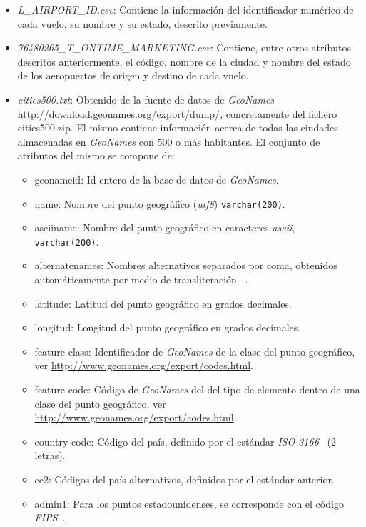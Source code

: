 \documentclass{article}
\begin{document}
\begin{itemize}
    \item \textit{L\_AIRPORT\_ID.csv}: Contiene la información del identificador numérico de cada vuelo, su nombre y su estado, descrito previamente.
    \item \textit{76480265\_T\_ONTIME\_MARKETING.csv}: Contiene, entre otros atributos descritos anteriormente, el código, nombre de la ciudad y nombre del estado de los aeropuertos de origen y destino de cada vuelo.
    \item \textit{cities500.txt}: Obtenido de la fuente de datos de \textit{GeoNames} \url{http://download.geonames.org/export/dump/}, concretamente del fichero cities500.zip. El mismo contiene información acerca de todas las ciudades almacenadas en \textit{GeoNames} con 500 o más habitantes. El conjunto de atributos del mismo se compone de:
        \begin{itemize}
            \item geonameid: Id entero de la base de datos de \textit{GeoNames}.
            \item name: Nombre del punto geográfico (\textit{utf8}) \texttt{varchar(200)}.
            \item asciiname: Nombre del punto geográfico en caracteres \textit{ascii}, \texttt{varchar(200)}.
            \item alternatenames: Nombres alternativos separados por coma, obtenidos automáticamente por medio de transliteración ~\cite{Transliteracion}.
            \item latitude: Latitud del punto geográfico en grados decimales.
            \item longitud: Longitud del punto geográfico en grados decimales.
            \item feature class: Identificador de \textit{GeoNames} de la clase del punto geográfico, ver \url{http://www.geonames.org/export/codes.html}.
            \item feature code: Código de \textit{GeoNames} del del tipo de elemento dentro de una clase del punto geográfico, ver \url{http://www.geonames.org/export/codes.html}.
            \item country code: Código del país, definido por el estándar \textit{ISO-3166}~\cite{ISO3166} (2 letras). 
            \item cc2: Códigos del país alternativos, definidos por el estándar anterior.
            \item admin1: Para los puntos estadounidenses, se corresponde con el código \textit{FIPS}~\cite{FIPS}.

\end{itemize}
\end{itemize}
\end{document}
